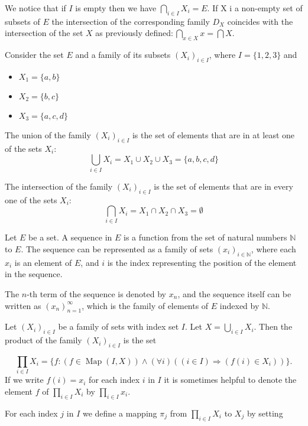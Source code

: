 We notice that if $I$ is empty then we have $\bigcap_{i\in I}X_i=E.$ If X i a non-empty set of subsets of $E$ the intersection of the corresponding family $D_X$ coincides with the intersection of the set $X$ as previously defined${: }\bigcap _{x\in X}x= \bigcap X.$
\begin{example}
Consider the set $E$ and a family of its subsets $(X_i)_{i \in I}$, where $I = \{1, 2, 3\}$ and
\begin{itemize}
	\item $X_1 = \{a, b\}$
	\item $X_2 = \{b, c\}$
	\item $X_3 = \{a, c, d\}$
\end{itemize}

The union of the family $(X_i)_{i \in I}$ is the set of elements that are in at least one of the sets $X_i$:
\[ \bigcup_{i \in I} X_i = X_1 \cup X_2 \cup X_3 = \{a, b, c, d\} \]

The intersection of the family $(X_i)_{i \in I}$ is the set of elements that are in every one of the sets $X_i$:
\[ \bigcap_{i \in I} X_i = X_1 \cap X_2 \cap X_3 = \emptyset \]
\end{example}

\begin{definition}
Let \( E \) be a set. A sequence in \( E \) is a function from the set of natural numbers \( \mathbb{N} \) to \( E \). The sequence can be represented as a family of sets \( (x_i)_{i \in \mathbb{N}} \), where each \( x_i \) is an element of \( E \), and \( i \) is the index representing the position of the element in the sequence.

The \( n \)-th term of the sequence is denoted by \( x_n \), and the sequence itself can be written as \( (x_n)_{n=1}^{\infty} \), which is the family of elements of \( E \) indexed by \( \mathbb{N} \).
\end{definition}

Let $(X_i)_{i\in I}$ be a family of sets with index set $I.$ Let $X=\bigcup_{i\in I}X_i.$ Then the product of the family $(X_i)_{i\in I}$ is the set

$$
\prod_{i\in I}X_i=\{f:(f\in\operatorname{Map}(I,X))\wedge(\forall i)((i\in I)\Longrightarrow(f(i)\in X_i))\}.
$$
If we write $f(i)=x_i$ for each index $i$ in $I$ it is sometimes helpful to denote the element $f$ of $\prod_{i\in I}X_i$ by $\prod_{i\in I}x_i.$

For each index $j$ in $I$ we define a mapping $\pi_j$ from $\prod_{i\in I}X_i$ to $X_j$ by setting


